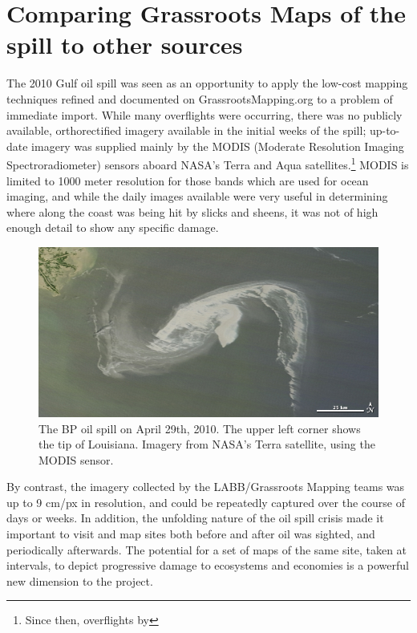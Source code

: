 \documentclass[11pt,oneside,notitlepage]{report}
\begin{document}

\section{Comparing Grassroots Maps of the spill to other sources}

The 2010 Gulf oil spill was seen as an opportunity to apply the low-cost mapping techniques refined and documented on GrassrootsMapping.org to a problem of immediate import. While many overflights were occurring, there was no publicly available, orthorectified imagery available in the initial weeks of the spill; up-to-date imagery was supplied mainly by the MODIS (Moderate Resolution Imaging Spectroradiometer) sensors aboard NASA's Terra and Aqua satellites.\footnote{Since then, overflights by } MODIS is limited to 1000 meter resolution for those bands which are used for ocean imaging, and while the daily images available were very useful in determining where along the coast was being hit by slicks and sheens, it was not of high enough detail to show any specific damage. 

\begin{figure}[h]
  \begin{center}
	\includegraphics[width=1\textwidth]{images/nasa-modis-small.jpg}
	\caption{The BP oil spill on April 29th, 2010. The upper left corner shows the tip of Louisiana. Imagery from NASA's Terra satellite, using the MODIS sensor.}
  \end{center}
\end{figure}

By contrast, the imagery collected by the LABB/Grassroots Mapping teams was up to 9 cm/px in resolution, and could be repeatedly captured over the course of days or weeks. In addition, the unfolding nature of the oil spill crisis made it important to visit and map sites both before and after oil was sighted, and periodically afterwards. The potential for a set of maps of the same site, taken at intervals, to depict progressive damage to ecosystems and economies is a powerful new dimension to the project.
\end{document}

